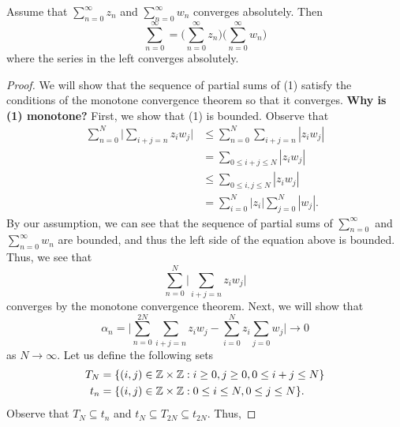 \documentclass[a4paper]{report}
\begin{document}
\begin{theorem}
    Assume that \( \sum_{ n = 0  }^{  \infty  } {z}_{n} \) and \( \sum_{ n=0  }^{  \infty  } {w}_{n}  \) converges absolutely. Then 
    \[  \sum_{ n=0 }^{ \infty  } = \Big(  \sum_{  n = 0  }^{ \infty  } {z}_{n} \Big) \Big(  \sum_{ n= 0  }^{ \infty  } {w}_{n} \Big) \tag{1} \]
where the series in the left converges absolutely.
\end{theorem}
\begin{proof}
We will show that the sequence of partial sums of (1) satisfy the conditions of the monotone convergence theorem so that it converges. \textbf{Why is (1) monotone?} First, we show that (1) is bounded. Observe that
\begin{align*}
    \sum_{ n = 0    }^{ N  }  \Big|  \sum_{ i + j = n  }^{  } {z}_{i} {w}_{j} \Big|  &\leq \sum_{ n = 0  }^{ N  } \sum_{ i + j = n  }^{   } | {z}_{i} {w}_{j} |  \\
                                                                                     &= \sum_{ 0 \leq i + j \leq N   }^{  }| {z}_{i} {w}_{j} | \\ 
                                                                                     &\leq \sum_{ 0 \leq i, j \leq N  }^{  } | {z}_{i} {w}_{j} | \\
                                                                                     &= \sum_{i = 0  }^{ N  } | {z}_{i}  |  \sum_{ j=0  }^{ N  } | {w}_{j} |. 
\end{align*}
By our assumption, we can see that the sequence of partial sums of \( \sum_{ n= 0  }^{  \infty  }    \) and \( \sum_{ n = 0  }^{  \infty  } {w}_{n} \) are bounded, and thus the left side of the equation above is bounded. Thus, we see that 
\[  \sum_{ n = 0  }^{  N  } \Big|  \sum_{  i + j = n  }^{   } {z}_{i} {w}_{j} \Big|  \] 
converges by the monotone convergence theorem. Next, we will show that 
\[  {\alpha}_{n} = \Big|  \sum_{ n = 0  }^{ 2N  } \sum_{  i + j = n  } {z}_{i} {w}_{j} - \sum_{ i = 0  }^{ N  } {z}_{i} \sum_{ j = 0  } {w}_{j}  \Big| \to 0  \]
as \( N \to \infty  \). Let us define the following sets
\begin{align*}
    {T}_{N} &= \{ (i,j) \in \mathbb{Z} \times \mathbb{Z} : i \geq 0 , j \geq 0, 0 \leq i + j \leq N  \}  \\
    {t}_{n} &= \{ (i,j) \in \mathbb{Z} \times \mathbb{Z} : 0 \leq i \leq N , 0 \leq j \leq N  \}.
\end{align*}
Observe that \( {T}_{N} \subseteq  {t}_{n} \) and \( {t}_{N} \subseteq  {T}_{2N } \subseteq  {t}_{2N} \). Thus, 

\end{proof}
\end{document}
